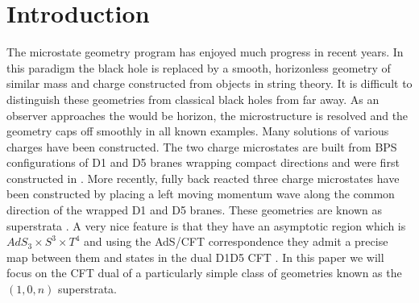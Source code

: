 \documentclass[11pt]{article}
\begin{document}
\setcounter{page}{1}


 
\tableofcontents





\newpage

\section{Introduction}

The microstate geometry program \cite{fuzzballs_i,fuzzballs_ii,fuzzballs_iii,fuzzballs_iv,fuzzballs_v} has enjoyed much progress in recent years. In this paradigm the black hole is replaced by a smooth, horizonless geometry of similar mass and charge constructed from objects in string theory. It is difficult to distinguish these geometries from classical black holes from far away. As an observer approaches the would be horizon, the microstructure is resolved and the geometry caps off smoothly in all known examples. Many solutions of various charges have been constructed. The two charge microstates are built from BPS configurations of D1 and D5 branes wrapping compact directions and were first constructed in \cite{Lunin:2001fv}. 
More recently, fully back reacted three charge microstates have been constructed by placing a left moving momentum wave along the common direction of the wrapped D1 and D5 branes. These geometries are known as superstrata \cite{Bena:2015bea,bmtw,bgmrstw2,bgmrstw,Ceplak:2018pws,hw}.  A very nice feature is that they have an asymptotic region which is $AdS_3\times S^3\times T^4$ and using the AdS/CFT correspondence \cite{maldacena,gkp,witten} they admit a precise map between them and states in the dual D1D5 CFT \cite{vev}. In this paper we will focus on the CFT dual of a particularly simple class of geometries known as the $(1,0,n)$ superstrata. 
\end{document}
